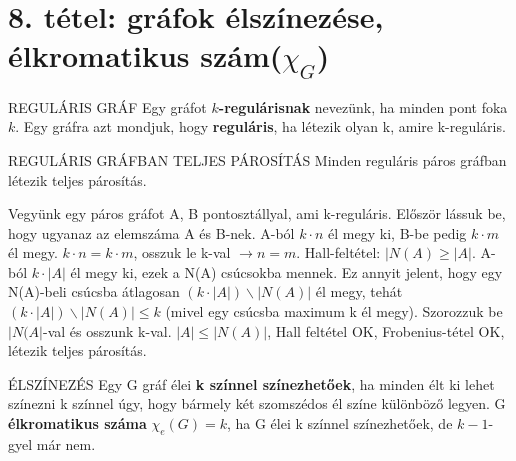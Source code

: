 \section{8. tétel: gráfok élszínezése, élkromatikus szám($\chi_G$)}


\begin{definicio}{REGULÁRIS GRÁF}
Egy gráfot \textbf{$k$-regulárisnak} nevezünk, ha minden pont foka $k$. Egy gráfra azt mondjuk, hogy \textbf{reguláris}, ha létezik olyan k, amire k-reguláris.
\end{definicio}

\begin{tetel}{REGULÁRIS GRÁFBAN TELJES PÁROSÍTÁS}
Minden reguláris páros gráfban létezik teljes párosítás.
\end{tetel}

\begin{bizonyitas}{}
Vegyünk egy páros gráfot A, B pontosztállyal, ami k-reguláris. Először lássuk be, hogy ugyanaz az elemszáma A és B-nek. A-ból $k\cdot n$ él megy ki, B-be pedig $k \cdot m$ él megy. $k\cdot n = k\cdot m$, osszuk le k-val $\rightarrow n = m$. Hall-feltétel: $|N(A) \geq |A|$. A-ból $k\cdot|A|$ él megy ki, ezek a N(A) csúcsokba mennek. Ez annyit jelent, hogy egy N(A)-beli csúcsba átlagosan $(k\cdot |A|) \backslash |N(A)|$ él megy, tehát $(k\cdot |A|) \backslash |N(A)| \leq k$ (mivel egy csúcsba maximum k él megy). Szorozzuk be $|N(A|$-val és osszunk k-val. $|A| \leq |N(A)|$, Hall feltétel OK, Frobenius-tétel OK, létezik teljes párosítás.
\end{bizonyitas}

\begin{definicio}{ÉLSZÍNEZÉS}
Egy G gráf élei \textbf{k színnel színezhetőek}, ha minden élt ki lehet színezni k színnel úgy, hogy bármely két szomszédos él színe különböző legyen. G \textbf{élkromatikus száma} $\chi_e(G) = k$, ha G élei k színnel színezhetőek, de $k - 1$-gyel már nem.
\end{definicio}

